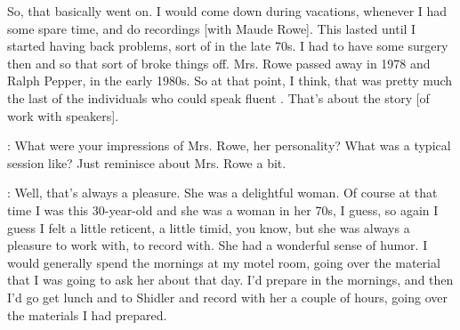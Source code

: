 \documentclass[output=paper]{LSP/langsci}
\begin{document}
So, that basically went on. I would come down during vacations, whenever I had some spare time, and do recordings [with Maude Rowe]. This lasted until I started having back problems, sort of in the late 70s. I had to have some surgery then and so that sort of broke things off. Mrs. Rowe passed away in 1978 and Ralph Pepper, in the early 1980s. So at that point, I think, that was pretty much the last of the individuals who could speak fluent . That's about the story [of work with  speakers].

:  What were your impressions of Mrs. Rowe, her personality? What was a typical session like? Just reminisce about Mrs. Rowe a bit.

:  Well, that's always a pleasure. She was a delightful woman. Of course at that time I was this 30-year-old and she was a woman in her 70s, I guess, so again I guess I felt a little reticent, a little timid, you know, but she was always a pleasure to work with, to record with. She had a wonderful sense of humor. I would generally spend the mornings at my motel room, going over the material that I was going to ask her about that day. I'd prepare in the mornings, and then I'd go get lunch and to Shidler and record with her a couple of hours, going over the materials I had prepared. 
\end{document}
